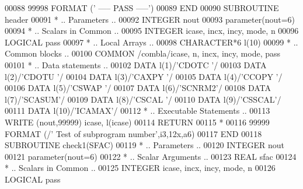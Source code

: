 \begin{DoxyCode}
00088 99998 \textcolor{keyword}{FORMAT} (\textcolor{stringliteral}{'                                    ----- PASS -----'})
00089 \textcolor{keyword}{      END}
00090 \textcolor{keyword}{      SUBROUTINE }header
00091 \textcolor{comment}{*     .. Parameters ..}
00092       \textcolor{keywordtype}{INTEGER}          nout
00093       parameter(nout=6)
00094 \textcolor{comment}{*     .. Scalars in Common ..}
00095       \textcolor{keywordtype}{INTEGER}          icase, incx, incy, mode, n
00096       \textcolor{keywordtype}{LOGICAL}          pass
00097 \textcolor{comment}{*     .. Local Arrays ..}
00098       \textcolor{keywordtype}{CHARACTER*6}      l(10)
00099 \textcolor{comment}{*     .. Common blocks ..}
00100       \textcolor{keyword}{COMMON}           /combla/icase, n, incx, incy, mode, pass
00101 \textcolor{comment}{*     .. Data statements ..}
00102       \textcolor{keyword}{DATA}             l(1)/\textcolor{stringliteral}{'CDOTC '}/
00103       \textcolor{keyword}{DATA}             l(2)/\textcolor{stringliteral}{'CDOTU '}/
00104       \textcolor{keyword}{DATA}             l(3)/\textcolor{stringliteral}{'CAXPY '}/
00105       \textcolor{keyword}{DATA}             l(4)/\textcolor{stringliteral}{'CCOPY '}/
00106       \textcolor{keyword}{DATA}             l(5)/\textcolor{stringliteral}{'CSWAP '}/
00107       \textcolor{keyword}{DATA}             l(6)/\textcolor{stringliteral}{'SCNRM2'}/
00108       \textcolor{keyword}{DATA}             l(7)/\textcolor{stringliteral}{'SCASUM'}/
00109       \textcolor{keyword}{DATA}             l(8)/\textcolor{stringliteral}{'CSCAL '}/
00110       \textcolor{keyword}{DATA}             l(9)/\textcolor{stringliteral}{'CSSCAL'}/
00111       \textcolor{keyword}{DATA}             l(10)/\textcolor{stringliteral}{'ICAMAX'}/
00112 \textcolor{comment}{*     .. Executable Statements ..}
00113       \textcolor{keyword}{WRITE} (nout,99999) icase, l(icase)
00114       \textcolor{keywordflow}{RETURN}
00115 \textcolor{comment}{*}
00116 99999 \textcolor{keyword}{FORMAT} (/\textcolor{stringliteral}{' Test of subprogram number'},i3,12x,a6)
00117 \textcolor{keyword}{      END}
00118 \textcolor{keyword}{      SUBROUTINE }check1(SFAC)
00119 \textcolor{comment}{*     .. Parameters ..}
00120       \textcolor{keywordtype}{INTEGER}           nout
00121       parameter(nout=6)
00122 \textcolor{comment}{*     .. Scalar Arguments ..}
00123       \textcolor{keywordtype}{REAL}              sfac
00124 \textcolor{comment}{*     .. Scalars in Common ..}
00125       \textcolor{keywordtype}{INTEGER}           icase, incx, incy, mode, n
00126       \textcolor{keywordtype}{LOGICAL}           pass

\end{DoxyCode}
